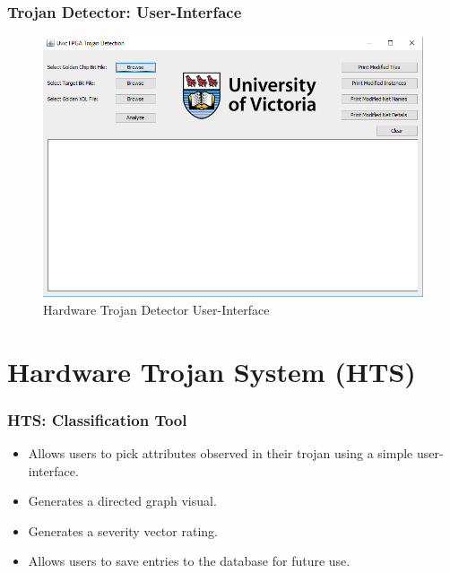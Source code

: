 \documentclass{beamer}
\begin{document}
%
%	
\begin{frame}
	\frametitle{Trojan Detector: User-Interface}
	\begin{figure}
		\centering
		\includegraphics[width=0.7\linewidth]{figs/trojanDetectorUI}
		\caption[Hardware Trojan Detector User-Interface]{Hardware Trojan Detector User-Interface}
		\label{fig:trojanDetectorUI}
	\end{figure}
\end{frame}

\section{Hardware Trojan System (HTS)}
\begin{frame}
	\frametitle{HTS: Classification Tool}
	\begin{itemize}
		\item Allows users to pick attributes observed in their trojan using a simple user-interface.
		\item Generates a directed graph visual.
		\item Generates a severity vector rating.
		\item Allows users to save entries to the database for future use.
	\end{itemize}
\end{frame}
\end{document}
